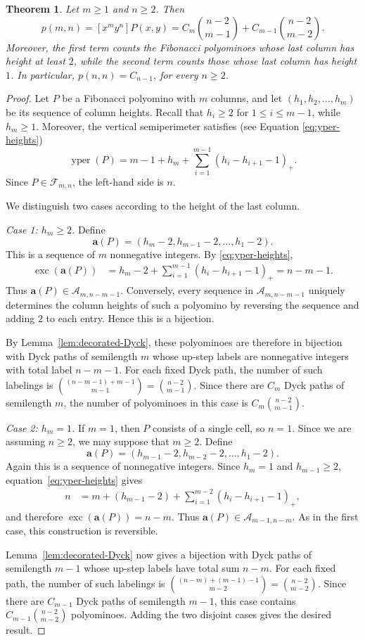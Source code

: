 \documentclass[12pt]{amsart}
\theoremstyle{plain}
\newtheorem{theorem}{Theorem}[section]
\theoremstyle{definition}
\newcommand{\F}{{\mathcal F}}
\DeclareMathOperator{\yper}{yper}
\begin{document}
\begin{theorem}\label{thm:Dyck-polyomino-bijection}
Let $m\geq 1$ and $n\geq 2$. Then
\[
p(m,n)
=
[x^my^n]P(x,y)
=
C_m\binom{n-2}{m-1}
+
C_{m-1}\binom{n-2}{m-2}.
\]
Moreover, the first term counts the Fibonacci polyominoes whose last
column has height at least $2$, while the second term counts those whose
last column has height $1$. In particular,
$p(n,n)=C_{n-1}$, 
for every $n\geq 2$.
\end{theorem}
\begin{proof}
Let $P$ be a Fibonacci polyomino with $m$ columns, and let
$(h_1,h_2,\ldots,h_m)$ be its sequence of column heights. Recall that $h_i\geq 2$ for $1\leq i\leq m-1$, while $h_m\geq 1$. Moreover, the vertical semiperimeter satisfies
 (see Equation \ref{eq:yper-heights})
\[\yper(P)
=
m-1+h_m
+
\sum_{i=1}^{m-1}(h_i-h_{i+1}-1)_+.
\]
Since $P\in\F_{m,n}$, the left-hand side is $n$.

We distinguish two cases according to the height of the last column.

\medskip
\noindent
\emph{Case 1: $h_m\geq 2$.}
Define
\[
\mathbf a(P)
=
(h_m-2,h_{m-1}-2,\ldots,h_1-2).
\]
This is a sequence of $m$ nonnegative integers. By
\eqref{eq:yper-heights},
\begin{align*}
\operatorname{exc}(\mathbf a(P))
&=
h_m-2
+
\sum_{i=1}^{m-1}(h_i-h_{i+1}-1)_+=n-m-1.
\end{align*}
Thus $\mathbf a(P)\in\mathcal A_{m,n-m-1}$. Conversely, every sequence in $\mathcal A_{m,n-m-1}$ uniquely determines
the column heights of such a polyomino by reversing the sequence and adding
$2$ to each entry. Hence this is a bijection.

By Lemma~\ref{lem:decorated-Dyck}, these polyominoes are therefore in
bijection with Dyck paths of semilength $m$ whose up-step labels are
nonnegative integers with total label $n-m-1$. For each fixed Dyck path,
the number of such labelings is $\binom{(n-m-1)+m-1}{m-1}
=
\binom{n-2}{m-1}$. Since there are $C_m$ Dyck paths of semilength $m$, the number of
polyominoes in this case is $C_m\binom{n-2}{m-1}$.

\medskip
\noindent
\emph{Case 2: $h_m=1$.}
If $m=1$, then $P$ consists of a single cell, so $n=1$. Since we are
assuming $n\geq 2$, we may suppose that $m\geq 2$. Define
\[
\mathbf a(P)
=
(h_{m-1}-2,h_{m-2}-2,\ldots,h_1-2).
\]
Again this is a sequence of nonnegative integers. Since $h_m=1$ and
$h_{m-1}\geq 2$, equation~\eqref{eq:yper-heights} gives
\begin{align*}
n
&=
m
+
(h_{m-1}-2)
+
\sum_{i=1}^{m-2}(h_i-h_{i+1}-1)_+,
\end{align*}
and therefore $\operatorname{exc}(\mathbf a(P))
=
n-m$. Thus
$\mathbf a(P)\in\mathcal A_{m-1,n-m}$. As in the first case, this construction is reversible.

Lemma~\ref{lem:decorated-Dyck} now gives a bijection with Dyck paths of
semilength $m-1$ whose up-step labels have total sum $n-m$. For each
fixed path, the number of such labelings is $
\binom{(n-m)+(m-1)-1}{m-2}
=
\binom{n-2}{m-2}$. Since there are $C_{m-1}$ Dyck paths of semilength $m-1$, this case
contains $C_{m-1}\binom{n-2}{m-2}$ 
polyominoes. Adding the two disjoint cases gives the desired result. 
\end{proof}
\end{document}
